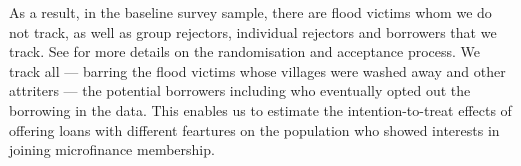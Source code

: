 	As a result, in the baseline survey sample, there are flood victims whom we do not track, as well as group rejectors, individual rejectors and borrowers that we track. See \citet{GUK2016} for more details on the randomisation and acceptance process. We track all --- barring the flood victims whose villages were washed away and other attriters --- the potential borrowers including who eventually opted out the borrowing in the data. This enables us to estimate the intention-to-treat effects of offering loans with different feartures on the population who showed interests in joining microfinance membership. 


